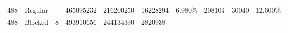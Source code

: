 \documentclass[11pt]{article}
\begin{document}
\begin{longtable}[]{@{}llllllllll@{}}
\begin{minipage}[t]{0.09\columnwidth}
488\strut
\end{minipage} & \begin{minipage}[t]{0.06\columnwidth}\raggedright\strut
Regular\strut
\end{minipage} & \begin{minipage}[t]{0.09\columnwidth}\raggedright\strut
-\strut
\end{minipage} & \begin{minipage}[t]{0.07\columnwidth}\raggedright\strut
465095232\strut
\end{minipage} & \begin{minipage}[t]{0.06\columnwidth}\raggedright\strut
216200250\strut
\end{minipage} & \begin{minipage}[t]{0.07\columnwidth}\raggedright\strut
16228294\strut
\end{minipage} & \begin{minipage}[t]{0.07\columnwidth}\raggedright\strut
6.980\%\strut
\end{minipage} & \begin{minipage}[t]{0.06\columnwidth}\raggedright\strut
208104\strut
\end{minipage} & \begin{minipage}[t]{0.07\columnwidth}\raggedright\strut
30040\strut
\end{minipage} & \begin{minipage}[t]{0.07\columnwidth}\raggedright\strut
12.600\%\strut
\end{minipage}\tabularnewline
\begin{minipage}[t]{0.09\columnwidth}\raggedright\strut
488\strut
\end{minipage} & \begin{minipage}[t]{0.06\columnwidth}\raggedright\strut
Blocked\strut
\end{minipage} & \begin{minipage}[t]{0.09\columnwidth}\raggedright\strut
8\strut
\end{minipage} & \begin{minipage}[t]{0.07\columnwidth}\raggedright\strut
493910656\strut
\end{minipage} & \begin{minipage}[t]{0.06\columnwidth}\raggedright\strut
244134390\strut
\end{minipage} & \begin{minipage}[t]{0.07\columnwidth}\raggedright\strut
2820938\strut
\end{minipage} & \begin{minipage}[t]{0.07\columnwidth}\raggedright\strut

\end{minipage}
\end{longtable}
\end{document}
